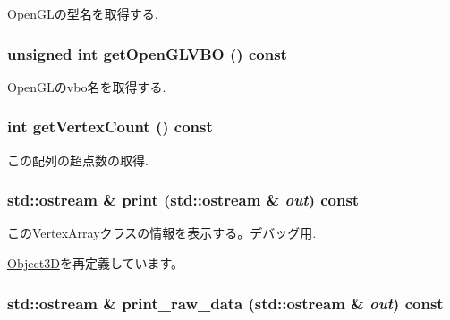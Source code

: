 OpenGLの型名を取得する. \hypertarget{classm3g_1_1VertexArray_720ecee697dbf11d5f90dc998817b39d}{
\subsubsection[{getOpenGLVBO}]{\setlength{\rightskip}{0pt plus 5cm}unsigned int getOpenGLVBO () const}}
\label{classm3g_1_1VertexArray_720ecee697dbf11d5f90dc998817b39d}


OpenGLのvbo名を取得する. \hypertarget{classm3g_1_1VertexArray_c1c9b7f5b0dcd9c0310d7e77e10081ba}{
\subsubsection[{getVertexCount}]{\setlength{\rightskip}{0pt plus 5cm}int getVertexCount () const}}
\label{classm3g_1_1VertexArray_c1c9b7f5b0dcd9c0310d7e77e10081ba}


この配列の超点数の取得. \hypertarget{classm3g_1_1VertexArray_6fea17fa1532df3794f8cb39cb4f911f}{
\subsubsection[{print}]{\setlength{\rightskip}{0pt plus 5cm}std::ostream \& print (std::ostream \& {\em out}) const}}
\label{classm3g_1_1VertexArray_6fea17fa1532df3794f8cb39cb4f911f}


このVertexArrayクラスの情報を表示する。デバッグ用. 

\hyperlink{classm3g_1_1Object3D_6fea17fa1532df3794f8cb39cb4f911f}{Object3D}を再定義しています。\hypertarget{classm3g_1_1VertexArray_85d61f1cdd10b3b5126cdb20291ae276}{
\subsubsection[{print\_\-raw\_\-data}]{\setlength{\rightskip}{0pt plus 5cm}std::ostream \& print\_\-raw\_\-data (std::ostream \& {\em out}) const}}
\label{classm3g_1_1VertexArray_85d61f1cdd10b3b5126cdb20291ae276}


